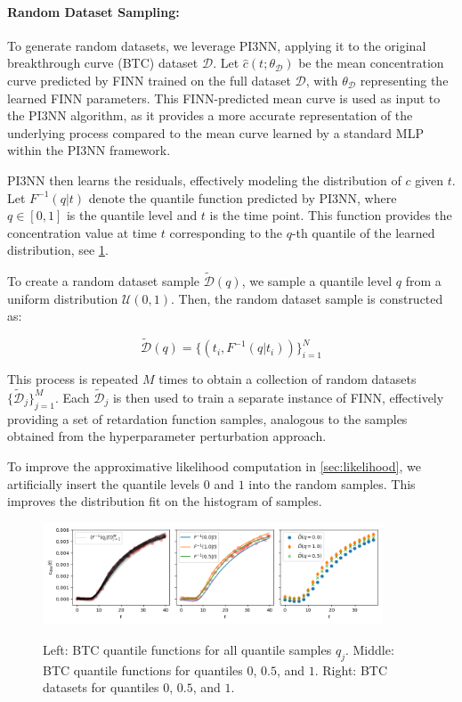 \documentclass{article}
\begin{document}
\paragraph{Random Dataset Sampling:}
\label{sec:random_dataset_sampling}
To generate random datasets, we leverage PI3NN, applying it to the original breakthrough curve (BTC) dataset $\mathcal{D}$. Let $\hat{c}(t; \theta_{\mathcal{D}})$ be the mean concentration curve predicted by FINN trained on the full dataset $\mathcal{D}$, with $\theta_{\mathcal{D}}$ representing the learned FINN parameters. This FINN-predicted mean curve is used as input to the PI3NN algorithm, as it provides a more accurate representation of the underlying process compared to the mean curve learned by a standard MLP within the PI3NN framework.

PI3NN then learns the residuals, effectively modeling the distribution of $c$ given $t$. Let $F^{-1}(q | t)$ denote the quantile function predicted by PI3NN, where $q \in [0, 1]$ is the quantile level and $t$ is the time point. This function provides the concentration value at time $t$ corresponding to the $q$-th quantile of the learned distribution, see \ref{fig:btc_dataspan_quantiles}.

To create a random dataset sample $\tilde{\mathcal{D}}(q)$, we sample a quantile level $q$ from a uniform distribution $\mathcal{U}(0, 1)$. Then, the random dataset sample is constructed as:

$$
\tilde{\mathcal{D}}(q) = \{ (t_i, F^{-1}(q | t_i) ) \}_{i=1}^N
$$

This process is repeated $M$ times to obtain a collection of random datasets $\{\tilde{\mathcal{D}}_j\}_{j=1}^M$. Each $\tilde{\mathcal{D}}_j$ is then used to train a separate instance of FINN, effectively providing a set of retardation function samples, analogous to the samples obtained from the hyperparameter perturbation approach.

To improve the approximative likelihood computation in \ref{sec:likelihood}, we artificially insert the quantile levels $0$ and $1$ into the random samples. This improves the distribution fit on the histogram of samples.

\begin{figure}
    \centering
    \includegraphics[width=0.9\textwidth]{figs/btc_dataspan_quantiles.png}
    \label{fig:btc_dataspan_quantiles}
    \caption{Left: BTC quantile functions for all quantile samples $q_j$. Middle: BTC quantile functions for quantiles $0$, $0.5$, and $1$. Right: BTC datasets for quantiles $0$, $0.5$, and $1$.}
\end{figure}
\end{document}
